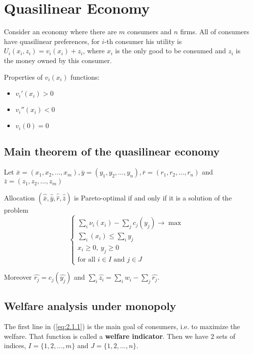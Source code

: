 \documentclass[a4paper, 10pt]{article}
\begin{document}
\section{Quasilinear Economy}
Consider an economy where there are $m$ consumers and $n$ firms. All of consumers have quasilinear preferences, for $i$-th consumer his utility is $U_i(x_i,z_i)=v_i(x_i)+z_i$, where $x_i$ is the only good to be consumed and $z_i$ is the money owned by this consumer.

Properties of $v_i(x_i)$ functions:
\begin{itemize}
    \item $v_i'(x_i)>0$
    \item $v_i''(x_i)<0$
    \item $v_i(0)=0$
\end{itemize}

\subsection{Main theorem of the quasilinear economy}
Let $\bar{x}=\left(x_1, x_2, \ldots, x_m\right), \bar{y}=\left(y_1, y_2, \ldots, y_n\right), \bar{r}=\left(r_1, r_2, \ldots, r_n\right)$ and $\bar{z}=\left(z_1, z_2, \ldots, z_m\right)$

Allocation $(\widehat{\bar{x}}, \widehat{\bar{y}}, \widehat{\hat{r}}, \widehat{\bar{z}})$ is Pareto-optimal if and only if it is a solution of the problem
\begin{equation}\label{eq:2.1.1}
\left\{\begin{array}{l}
\sum_i \nu_i\left(x_i\right)-\sum_j c_j\left(y_j\right) \longrightarrow \max \\
\sum_i\left(x_i\right) \leq \sum_i y_j \\
x_i \geq 0,\ y_j \geq 0 \\
\text {for all } i \in I \text { and } j \in J
\end{array}\right.
\end{equation}


Moreover $\widehat{r_j}=c_j\left(\widehat{y_j}\right)$ and $\sum_i \widehat{z_i}=\sum_i w_i-\sum_j \widehat{r_j}$.

\subsection{Welfare analysis under monopoly}
The first line in (\ref{eq:2.1.1}) is the main goal of consumers, i.e. to maximize the welfare. That function is called a \textbf{welfare indicator}. Then we have $2$ sets of indices, $I = \{1,2,\ldots,m\}$ and
$J = \{1,2,\ldots,n\}$.
\end{document}
